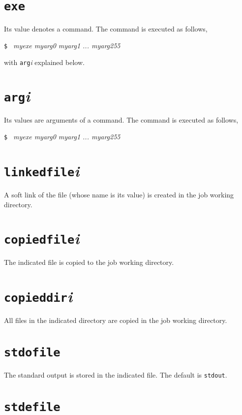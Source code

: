 \documentclass[a4paper,10pt]{report}
\begin{document}
\section{\texttt{exe}}

Its value denotes a command.  The command is executed as follows,
\begin{screen}
\texttt{\$ } \textit{myexe myarg0 myarg1 ... myarg255}
\end{screen}
with \texttt{arg}\textit{i} explained below.

\section{\texttt{arg}\textit{i}}

Its values are arguments of a command.  The command is executed as
follows,
\begin{screen}
\texttt{\$ } \textit{myexe myarg0 myarg1 ... myarg255}
\end{screen}

\section{\texttt{linkedfile}\textit{i}}

A soft link of the file (whose name is its value) is created in the
job working directory.

\section{\texttt{copiedfile}\textit{i}}

The indicated file is copied to the job working directory.

\section{\texttt{copieddir}\textit{i}}

All files in the indicated directory are copied
in the job working directory.

\section{\texttt{stdofile}}

The standard output is stored in the indicated file.
The default is \texttt{stdout}.

\section{\texttt{stdefile}}
\end{document}

